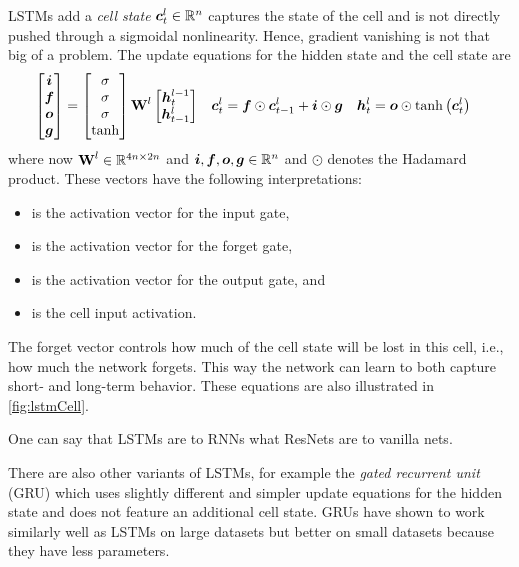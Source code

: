 		LSTMs add a \emph{cell state} \( \bm{c}_t^l \in \mathbb{R}^n \) captures the state of the cell and is not directly pushed through a sigmoidal nonlinearity. Hence, gradient vanishing is not that big of a problem. The update equations for the hidden state and the cell state are
		\begin{align}
			\begin{bmatrix}
				\bm{i} \\
				\bm{f} \\
				\bm{o} \\
				\bm{g}
			\end{bmatrix}
			                     & =
			\begin{bmatrix}
				\sigma \\
				\sigma \\
				\sigma \\
				\tanh
			\end{bmatrix}
			\bm{\mathrm{W}}^l
			\begin{bmatrix}
				\bm{h}_t^{l - 1} \\
				\bm{h}_{t - 1}^l
			\end{bmatrix} &
			\bm{c}_t^l          & = \bm{f} \odot \bm{c}_{t - 1}^l + \bm{i} \odot \bm{g} &
			\bm{h}_t^l          & = \bm{o} \odot \tanh\big( \bm{c}_t^l \big)
		\end{align}
		where now \( \bm{\mathrm{W}}^l \in \mathbb{R}^{4n \times 2n} \) and \( \bm{i}, \bm{f}, \bm{o}, \bm{g} \in \mathbb{R}^n \) and \( \odot \) denotes the Hadamard product. These vectors have the following interpretations:
		\begin{itemize}
			\item {} is the activation vector for the input gate,
			\item {} is the activation vector for the forget gate,
			\item {} is the activation vector for the output gate, and
			\item {} is the cell input activation.
		\end{itemize}
		The forget vector controls how much of the cell state will be lost in this cell, i.e., how much the network forgets. This way the network can learn to both capture short- and long-term behavior. These equations are also illustrated in \autoref{fig:lstmCell}.

		One can say that LSTMs are to RNNs what ResNets are to vanilla nets.

		There are also other variants of LSTMs, for example the \emph{gated recurrent unit} (GRU) which uses slightly different and simpler update equations for the hidden state and does not feature an additional cell state. GRUs have shown to work similarly well as LSTMs on large datasets but better on small datasets because they have less parameters.

